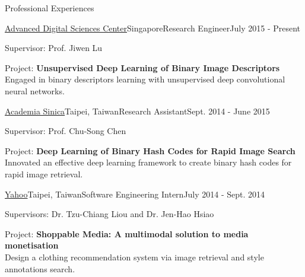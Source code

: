\documentclass{resume} %
\begin{document}
\begin{rSection}{Professional Experiences}

\begin{mySubsection}{\href{http://adsc.illinois.edu/}{Advanced Digital Sciences Center}}{Singapore}{Research Engineer}{July 2015 - Present}
\item Supervisor: Prof. Jiwen Lu
\item Project: \textbf{Unsupervised Deep Learning of Binary Image Descriptors}\\Engaged in binary descriptors learning with unsupervised deep convolutional neural networks.


\end{mySubsection}

\begin{mySubsection}{\href{http://www.iis.sinica.edu.tw/index_en.html}{Academia Sinica}}{Taipei, Taiwan}{Research Assistant}{Sept. 2014 - June 2015}
\item Supervisor: Prof. Chu-Song Chen
\item Project: \textbf{Deep Learning of Binary Hash Codes for Rapid Image Search}\\Innovated an effective deep learning framework to create binary hash codes for rapid image retrieval.
\end{mySubsection}
\begin{mySubsection}{\href{http://tw.yahoo.com}{Yahoo}}{Taipei, Taiwan}{Software Engineering Intern}{July 2014 - Sept. 2014}
\item Supervisors: Dr. Tzu-Chiang Liou and Dr. Jen-Hao Hsiao
\item Project: \textbf{Shoppable Media: A multimodal solution to media monetisation} \\Design a clothing recommendation system via image retrieval and style annotations search. 


\end{mySubsection}
\end{rSection}
\end{document}

